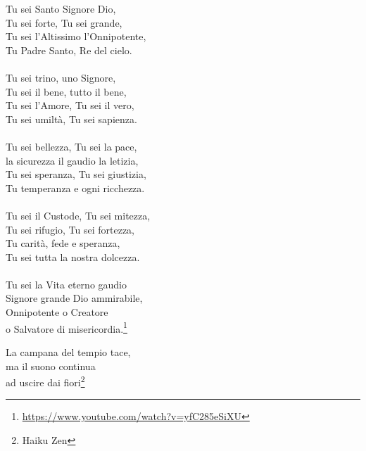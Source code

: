 \begin{haiku}
Tu sei Santo Signore Dio,\\
Tu sei forte, Tu sei grande,\\
Tu sei l'Altissimo l'Onnipotente,\\
Tu Padre Santo, Re del cielo.\\
\leavevmode\\
Tu sei trino, uno Signore,\\
Tu sei il bene, tutto il bene,\\
Tu sei l'Amore, Tu sei il vero,\\
Tu sei umiltà, Tu sei sapienza.\\
\leavevmode\\
Tu sei bellezza, Tu sei la pace,\\
la sicurezza il gaudio la letizia,\\
Tu sei speranza, Tu sei giustizia,\\
Tu temperanza e ogni ricchezza.\\
\leavevmode\\
Tu sei il Custode, Tu sei mitezza,\\
Tu sei rifugio, Tu sei fortezza,\\
Tu carità, fede e speranza,\\
Tu sei tutta la nostra dolcezza.\\
\leavevmode\\
Tu sei la Vita eterno gaudio\\
Signore grande Dio ammirabile,\\
Onnipotente o Creatore\\
    o Salvatore di misericordia.\footnote{\url{https://www.youtube.com/watch?v=yfC285eSiXU}}\\
\end{haiku}

\begin{haiku}
La campana del tempio tace,\\
ma il suono continua\\
ad uscire dai fiori\footnote{Haiku Zen}\\
\end{haiku}

